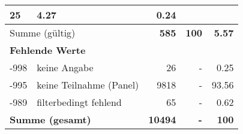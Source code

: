 \begin{longtable}{lXrrr}
       \num{25} &
       \num[round-mode=places,round-precision=2]{4,27} &
         \num[round-mode=places,round-precision=2]{0,24} \\
     \midrule
     \multicolumn{2}{l}{Summe (gültig)} &
       \textbf{\num{585}} &
     \textbf{100} &
       \textbf{\num[round-mode=places,round-precision=2]{5,57}} \\
     \multicolumn{5}{l}{\textbf{Fehlende Werte}}\\
       -998 &
       keine Angabe &
         \num{26} &
        - &
         \num[round-mode=places,round-precision=2]{0,25} \\
       -995 &
       keine Teilnahme (Panel) &
         \num{9818} &
        - &
         \num[round-mode=places,round-precision=2]{93,56} \\
       -989 &
       filterbedingt fehlend &
         \num{65} &
        - &
         \num[round-mode=places,round-precision=2]{0,62} \\
     \midrule
     \multicolumn{2}{l}{\textbf{Summe (gesamt)}} &
          \textbf{\num{10494}} &
        \textbf{-} &
        \textbf{100} \\
     \bottomrule
     \end{longtable}
     
